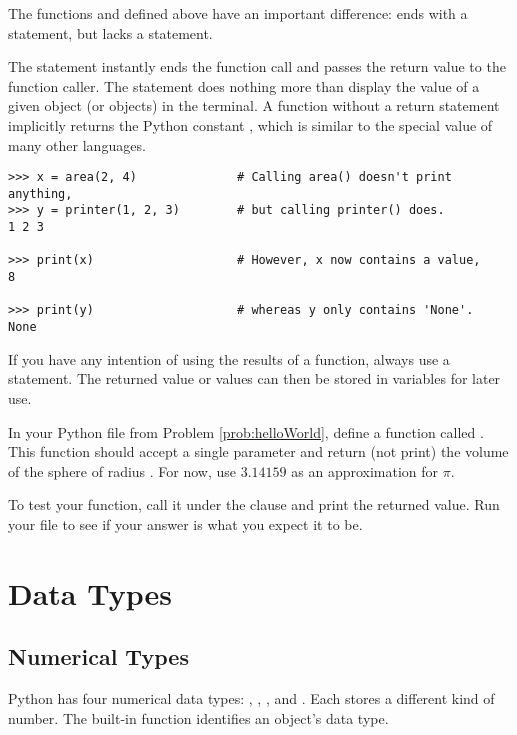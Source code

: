 \begin{info} %
The functions  and  defined above have an important difference:  ends with a  statement, but  lacks a  statement.

The  statement instantly ends the function call and passes the return value to the function caller.
The  statement does nothing more than display the value of a given object (or objects) in the terminal.
A function without a return statement implicitly returns the Python constant , which is similar to the  special value of many other languages.

\begin{lstlisting}
>>> x = area(2, 4)              # Calling area() doesn't print anything,
>>> y = printer(1, 2, 3)        # but calling printer() does.
1 2 3

>>> print(x)                    # However, x now contains a value,
8

>>> print(y)                    # whereas y only contains 'None'.
None
\end{lstlisting}

If you have any intention of using the results of a function, always use a  statement.
The returned value or values can then be stored in variables for later use.
\end{info}

\begin{problem} %
In your Python file from Problem \ref{prob:helloWorld}, define a function called .
This function should accept a single parameter  and return (not print) the volume of the sphere of radius .
For now, use $3.14159$ as an approximation for $\pi$.

To test your function, call it under the  clause and print the returned value.
Run your file to see if your answer is what you expect it to be.
\end{problem}

\section*{Data Types} %

\subsection*{Numerical Types} %
Python has four numerical data types: , , 
, and .
Each stores a different kind of number.
The built-in function  identifies an object's data type.

